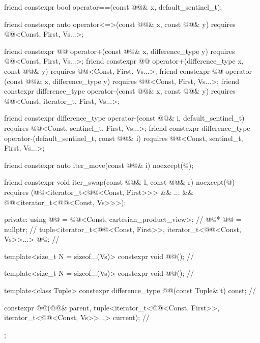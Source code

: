 \begin{codeblock}
{{    friend constexpr bool operator==(const @@& x, default_sentinel_t);

    friend constexpr auto operator<=>(const @@& x, const @@& y)
      requires @@<Const, First, Vs...>;

    friend constexpr @@ operator+(const @@& x, difference_type y)
      requires @@<Const, First, Vs...>;
    friend constexpr @@ operator+(difference_type x, const @@& y)
      requires @@<Const, First, Vs...>;
    friend constexpr @@ operator-(const @@& x, difference_type y)
      requires @@<Const, First, Vs...>;
    friend constexpr difference_type operator-(const @@& x, const @@& y)
      requires @@<Const, iterator_t, First, Vs...>;

    friend constexpr difference_type operator-(const @@& i, default_sentinel_t)
      requires @@<Const, sentinel_t, First, Vs...>;
    friend constexpr difference_type operator-(default_sentinel_t, const @@& i)
      requires @@<Const, sentinel_t, First, Vs...>;

    friend constexpr auto iter_move(const @@& i) noexcept(@\seebelow@);

    friend constexpr void iter_swap(const @@& l, const @@& r) noexcept(@\seebelow@)
      requires (@@<iterator_t<@@<Const, First>>> && ... &&
        @@<iterator_t<@@<Const, Vs>>>);

  private:
    using @@ = @@<Const, cartesian_product_view>;          // \expos
    @@* @@ = nullptr;                                          // \expos
    tuple<iterator_t<@@<Const, First>>,
      iterator_t<@@<Const, Vs>>...> @@;                  // \expos

    template<size_t N = sizeof...(Vs)>
      constexpr void @@();                                            // \expos

    template<size_t N = sizeof...(Vs)>
      constexpr void @@();                                            // \expos

    template<class Tuple>
      constexpr difference_type @@(const Tuple& t) const;    // \expos

    constexpr @@(@@& parent, tuple<iterator_t<@@<Const, First>>,
      iterator_t<@@<Const, Vs>>...> current);                  // \expos
  };
}
\end{codeblock}

